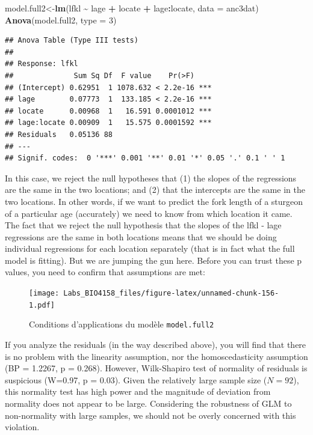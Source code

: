 \documentclass[
  12pt,
]{book}
\newenvironment{Shaded}{\begin{snugshade}}{\end{snugshade}}
\newcommand{\DataTypeTok}[1]{\textcolor[rgb]{0.13,0.29,0.53}{#1}}
\newcommand{\DecValTok}[1]{\textcolor[rgb]{0.00,0.00,0.81}{#1}}
\newcommand{\KeywordTok}[1]{\textcolor[rgb]{0.13,0.29,0.53}{\textbf{#1}}}
\newcommand{\NormalTok}[1]{#1}
\newcommand{\OperatorTok}[1]{\textcolor[rgb]{0.81,0.36,0.00}{\textbf{#1}}}
\newcommand{\StringTok}[1]{\textcolor[rgb]{0.31,0.60,0.02}{#1}}
\begin{document}
\begin{Shaded}
\begin{Highlighting}[]
\NormalTok{model.full2\textless{}{-}}\KeywordTok{lm}\NormalTok{(lfkl }\OperatorTok{\textasciitilde{}}\StringTok{ }\NormalTok{lage }\OperatorTok{+}\StringTok{ }\NormalTok{locate }\OperatorTok{+}\StringTok{ }\NormalTok{lage}\OperatorTok{:}\NormalTok{locate, }\DataTypeTok{data =}\NormalTok{ anc3dat)}
\KeywordTok{Anova}\NormalTok{(model.full2, }\DataTypeTok{type =} \DecValTok{3}\NormalTok{)}
\end{Highlighting}
\end{Shaded}

\begin{verbatim}
## Anova Table (Type III tests)
## 
## Response: lfkl
##              Sum Sq Df  F value    Pr(>F)    
## (Intercept) 0.62951  1 1078.632 < 2.2e-16 ***
## lage        0.07773  1  133.185 < 2.2e-16 ***
## locate      0.00968  1   16.591 0.0001012 ***
## lage:locate 0.00909  1   15.575 0.0001592 ***
## Residuals   0.05136 88                       
## ---
## Signif. codes:  0 '***' 0.001 '**' 0.01 '*' 0.05 '.' 0.1 ' ' 1
\end{verbatim}

In this case, we reject the null hypotheses that (1) the slopes of the regressions are the same in the two locations; and (2) that the intercepts are the same in the two locations. In other words, if we want to predict the fork length of a sturgeon of a particular age (accurately) we need to know from which location it came. The fact that we reject the null hypothesis that the slopes of the lfkl - lage regressions are the same in both locations means that we should be doing individual regressions for each location separately (that is in fact what the full model is fitting). But we are jumping the gun here. Before you can trust these p values, you need to confirm that assumptions are met:

\begin{figure}
\centering
\texttt{[image: Labs\_BIO4158\_files/figure-latex/unnamed-chunk-156-1.pdf]}
\caption{\label{fig:unnamed-chunk-156}Conditions d'applications du modèle \texttt{model.full2}}
\end{figure}

If you analyze the residuals (in the way described above), you will find that there is no problem with the linearity assumption, nor the homoscedasticity assumption (BP = 1.2267, p = 0.268). However, Wilk-Shapiro test of normality of residuals is suspicious (W=0.97, p = 0.03). Given the relatively large sample size (\(N = 92\)), this normality test has high power and the magnitude of deviation from normality does not appear to be large. Considering the robustness of GLM to non-normality with large samples, we should not be overly concerned with this violation.
\end{document}

